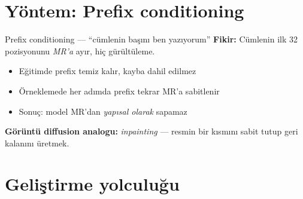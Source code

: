 \documentclass[10pt,aspectratio=169]{beamer}
\begin{document}
\section{Yöntem: Prefix conditioning}

\begin{frame}{Prefix conditioning --- ``cümlenin başını ben yazıyorum''}
  \textbf{Fikir:} Cümlenin ilk 32 pozisyonunu \emph{MR'a} ayır, hiç gürültüleme.
  \vspace{0.3em}
  \begin{itemize}
    \item Eğitimde prefix temiz kalır, kayba dahil edilmez
    \item Örneklemede her adımda prefix tekrar MR'a sabitlenir
    \item Sonuç: model MR'dan \emph{yapısal olarak} sapamaz
  \end{itemize}

  \vspace{0.4em}
  \begin{center}
  \end{center}

  \vspace{0.4em}
  \textbf{Görüntü diffusion analogu:} \emph{inpainting} ---
  resmin bir kısmını sabit tutup geri kalanını üretmek.
\end{frame}

\section{Geliştirme yolculuğu}
\end{document}
